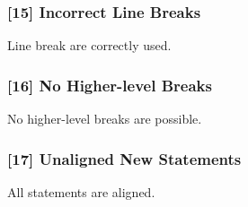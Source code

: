 \subsubsection{[15] Incorrect Line Breaks}
Line break are correctly used.
\subsubsection{[16] No Higher-level Breaks}
No higher-level breaks are possible.
\subsubsection{[17] Unaligned New Statements}
All statements are aligned.